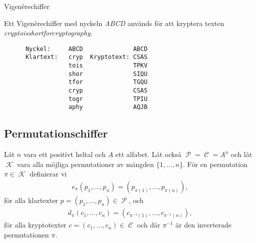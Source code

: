 \documentclass{beamer}
\theoremstyle{definition}
\DeclareMathOperator{\p}{\mathcal{P}}
\let\P\p
\DeclareMathOperator{\C}{\mathcal{C}}
\DeclareMathOperator{\K}{\mathcal{K}}
\let\stoch\mathbf
\renewcommand{\p}{\stoch P}
\begin{document}
\begin{frame}[fragile]{\insertsubsectionhead}{Vigenèrechiffer}
  \begin{example}
    \label{ex:VigenereKolumner}
    Ett Vigenèrechiffer med nyckeln \emph{ABCD} används för att kryptera texten 
    \emph{cryptoisshortforcryptography}.
    \begin{verbatim}
      Nyckel:     ABCD              ABCD
      Klartext:   cryp  Kryptotext: CSAS
                  tois              TPKV
                  shor              SIQU
                  tfor              TGQU
                  cryp              CSAS
                  togr              TPIU
                  aphy              AQJB
    \end{verbatim}
  \end{example}
\end{frame}

\subsection{Permutationschiffer}

\begin{frame}{\insertsubsectionhead}
  \begin{definition}[Permutationschiffer]\label{def:permutationCipher}
    Låt \(n\) vara ett positivt heltal och \(A\) ett alfabet.
    Låt också \(\P = \C = A^n\) och låt \(\K\) vara alla möjliga permutationer 
    av mängden \(\{1,\ldots,n\}\).
    För en permutation \(\pi\in \K\) definierar vi
    \begin{align}
      \nonumber
      e_\pi(p_1,\ldots,p_n) = (p_{\pi(1)},\ldots,p_{\pi(n)}),
    \end{align}
    för alla klartexter \(p = (p_1,\ldots,p_n)\in \P\), och
    \begin{align}
      \nonumber
      d_\pi(c_1,\ldots,c_n) = (c_{\pi^{-1}(1)},\ldots,c_{\pi^{-1}(n)}),
    \end{align}
    för alla kryptotexter \(c = (c_1,\ldots,c_n)\in \C\) och där \(\pi^{-1}\) 
    är den inverterade permutationen \(\pi\).
  \end{definition}
\end{frame}
\end{document}
